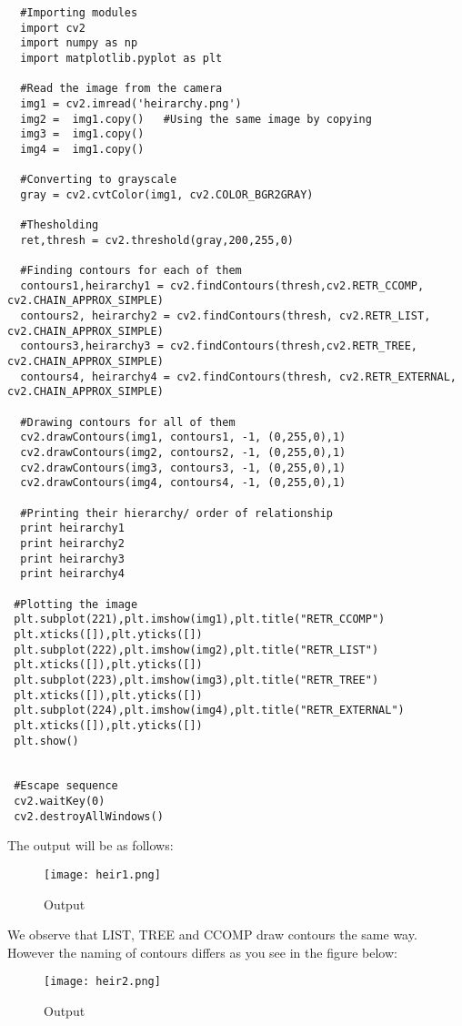 \documentclass[]{article}
\begin{document}
\begin{verbatim}
  #Importing modules
  import cv2
  import numpy as np
  import matplotlib.pyplot as plt

  #Read the image from the camera
  img1 = cv2.imread('heirarchy.png')
  img2 =  img1.copy()   #Using the same image by copying
  img3 =  img1.copy()
  img4 =  img1.copy()

  #Converting to grayscale
  gray = cv2.cvtColor(img1, cv2.COLOR_BGR2GRAY)

  #Thesholding
  ret,thresh = cv2.threshold(gray,200,255,0)

  #Finding contours for each of them
  contours1,heirarchy1 = cv2.findContours(thresh,cv2.RETR_CCOMP, cv2.CHAIN_APPROX_SIMPLE)
  contours2, heirarchy2 = cv2.findContours(thresh, cv2.RETR_LIST, cv2.CHAIN_APPROX_SIMPLE)
  contours3,heirarchy3 = cv2.findContours(thresh,cv2.RETR_TREE, cv2.CHAIN_APPROX_SIMPLE)
  contours4, heirarchy4 = cv2.findContours(thresh, cv2.RETR_EXTERNAL, cv2.CHAIN_APPROX_SIMPLE)

  #Drawing contours for all of them
  cv2.drawContours(img1, contours1, -1, (0,255,0),1)
  cv2.drawContours(img2, contours2, -1, (0,255,0),1)
  cv2.drawContours(img3, contours3, -1, (0,255,0),1)
  cv2.drawContours(img4, contours4, -1, (0,255,0),1)

  #Printing their hierarchy/ order of relationship
  print heirarchy1
  print heirarchy2
  print heirarchy3
  print heirarchy4

 #Plotting the image 
 plt.subplot(221),plt.imshow(img1),plt.title("RETR_CCOMP")
 plt.xticks([]),plt.yticks([])
 plt.subplot(222),plt.imshow(img2),plt.title("RETR_LIST")
 plt.xticks([]),plt.yticks([])
 plt.subplot(223),plt.imshow(img3),plt.title("RETR_TREE")
 plt.xticks([]),plt.yticks([])
 plt.subplot(224),plt.imshow(img4),plt.title("RETR_EXTERNAL")
 plt.xticks([]),plt.yticks([])
 plt.show()


 #Escape sequence
 cv2.waitKey(0)
 cv2.destroyAllWindows()
\end{verbatim}

The output will be as follows:

\begin{figure}[htbp]
\centering
\texttt{[image: heir1.png]}
\caption{Output}
\end{figure}

We observe that LIST, TREE and CCOMP draw contours the same way. However
the naming of contours differs as you see in the figure below:\\
\begin{figure}
\centering
\texttt{[image: heir2.png]} 
\caption{Output}
\end{figure}
\end{document}
